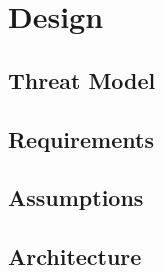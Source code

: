 \section{Design} \label{sec:design}

%
    

\subsection{Threat Model}\label{subsec:threat-model}


\subsection{Requirements} \label{subsec:requirements}
\subsection{Assumptions}\label{subsec:assumptions}
\subsection{Architecture} \label{subsec:arch}
